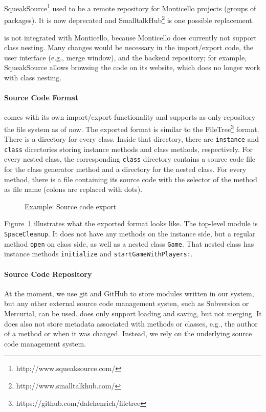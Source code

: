 SqueakSource\footnote{http://www.squeaksource.com/} used to be a remote repository for Monticello projects (groups of packages). It is now deprecated and SmalltalkHub\footnote{http://www.smalltalkhub.com/} is one possible replacement.

\msname is not integrated with Monticello, because Monticello does currently not support class nesting. Many changes would be necessary in the import/export code, the user interface (e.g., merge window), and the backend repository; for example, SqueakSource allows browsing the code on its website, which does no longer work with class nesting.

\paragraph{Source Code Format}
\msname comes with its own import/export functionality and supports as only repository the file system as of now. The exported format is similar to the FileTree\footnote{https://github.com/dalehenrich/filetree} format. There is a directory for every class. Inside that directory, there are \texttt{instance} and \texttt{class} directories storing instance methods and class methods, respectively. For every nested class, the corresponding \texttt{class} directory contains a source code file for the class generator method and a directory for the nested class. For every method, there is a file containing its source code with the selector of the method as file name (colons are replaced with dots).

\begin{figure}[!htp]
\caption{Example: Source code export}
\label{fig:impl_source_export}
\end{figure}

Figure~\ref{fig:impl_source_export} illustrates what the exported format looks like. The top-level module is \texttt{SpaceCleanup}. It does not have any methods on the instance side, but a regular method \texttt{open} on class side, as well as a nested class \texttt{Game}. That nested class has instance methods \texttt{initialize} and \texttt{startGameWithPlayers:}.

\paragraph{Source Code Repository}
At the moment, we use git and GitHub to store modules written in our system, but any other external source code management systen, such as Subversion or Mercurial, can be used. \msname does only support loading and saving, but not merging. It does also not store metadata associated with methods or classes, e.g., the author of a method or when it was changed. Instead, we rely on the underlying source code management system.

